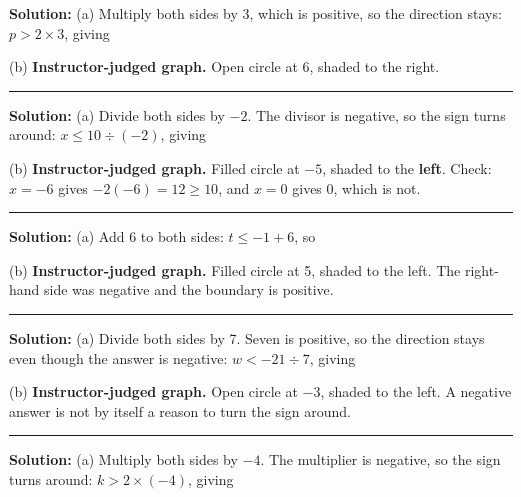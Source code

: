 \documentclass[12pt]{article}
\begin{document}
\textbf{Solution:} (a) Multiply both sides by 3, which is positive, so the direction stays: $p > 2 \times 3$, giving 

(b) \textbf{Instructor-judged graph.} Open circle at 6, shaded to the right.

\vspace{0.2cm}\noindent\rule{\linewidth}{0.2pt}\vspace{0.2cm}


\textbf{Solution:} (a) Divide both sides by $-2$. The divisor is negative, so the sign turns around: $x \leq 10 \div (-2)$, giving 

(b) \textbf{Instructor-judged graph.} Filled circle at $-5$, shaded to the \textbf{left}. Check: $x = -6$ gives $-2(-6) = 12 \geq 10$, and $x = 0$ gives $0$, which is not.

\vspace{0.2cm}\noindent\rule{\linewidth}{0.2pt}\vspace{0.2cm}


\textbf{Solution:} (a) Add 6 to both sides: $t \leq -1 + 6$, so 

(b) \textbf{Instructor-judged graph.} Filled circle at 5, shaded to the left. The right-hand side was negative and the boundary is positive.

\vspace{0.2cm}\noindent\rule{\linewidth}{0.2pt}\vspace{0.2cm}


\textbf{Solution:} (a) Divide both sides by 7. Seven is positive, so the direction stays even though the answer is negative: $w < -21 \div 7$, giving 

(b) \textbf{Instructor-judged graph.} Open circle at $-3$, shaded to the left. A negative answer is not by itself a reason to turn the sign around.

\vspace{0.2cm}\noindent\rule{\linewidth}{0.2pt}\vspace{0.2cm}


\textbf{Solution:} (a) Multiply both sides by $-4$. The multiplier is negative, so the sign turns around: $k > 2 \times (-4)$, giving 
\end{document}
